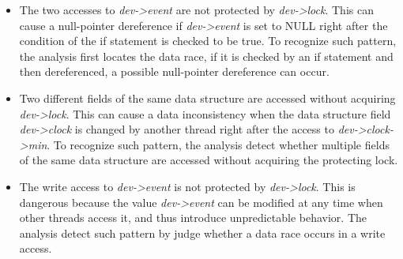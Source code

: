 \begin{itemize}
	\item {} The two accesses to {\em dev->event} 
	are not protected by {\em dev->lock}. This can cause a null-pointer 
	dereference if {\em dev->event} is set to NULL right after the condition of 
	the if statement is checked to be true. To recognize such pattern, the 
	analysis first locates the data race, if it is checked by an if statement 
	and then dereferenced, a possible null-pointer dereference can occur.
	\item {} Two different fields of the same data 
	structure are accessed without acquiring {\em dev->lock}. This can cause a 
	data inconsistency when the data structure field {\em dev->clock} is 
	changed by another thread right after the access to {\em dev->clock->min}. 
	To recognize such pattern, the analysis detect whether multiple fields of 
	the same data structure are accessed without acquiring the protecting lock.
	\item {} The write access to {\em dev->event} is not 
	protected by {\em dev->lock}. This is dangerous because the value {\em 
	dev->event} can be modified at any time when other threads access it, and 
	thus introduce unpredictable behavior. The analysis detect such pattern by 
	judge whether a data race occurs in a write access.
\end{itemize}

